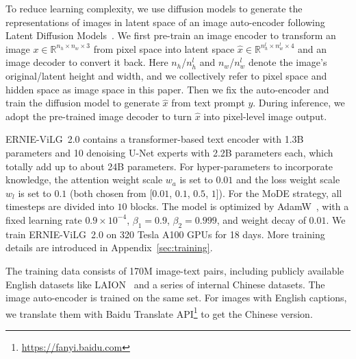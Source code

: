 \documentclass[10pt,twocolumn,letterpaper]{article}
\begin{document}
To reduce learning complexity, we use diffusion models to generate the representations of images in latent space of an image auto-encoder following Latent Diffusion Models~\cite{DBLP:journals/corr/abs-2112-10752}.
We first pre-train an image encoder to transform an image $x \in \mathbb{R}^{n_{h} \times n_{w} \times 3}$ from pixel space into latent space $ \hat{x} \in \mathbb{R}^{n_{h}^{l} \times n_{w}^{l} \times 4}$ and an image decoder to convert it back. Here $n_{h}$/$n_{h}^{l}$ and $n_{w}$/$n_{w}^{l}$ denote the image's original/latent height and width, and we collectively refer to pixel space and hidden space as image space in this paper.
Then we fix the auto-encoder and train the diffusion model to generate $\hat{x}$ from text prompt $y$.
During inference, we adopt the pre-trained image decoder to turn $\hat{x}$ into pixel-level image output.

ERNIE-ViLG~2.0 contains a transformer-based text encoder with 1.3B parameters and 10 denoising U-Net experts with 2.2B parameters each, which totally add up to about 24B parameters.
For hyper-parameters to incorporate knowledge, the attention weight scale $w_a$ is set to $0.01$ and the loss weight scale $w_l$ is set to $0.1$ (both chosen from [$0.01$, $0.1$, $0.5$, $1$]).
For the MoDE strategy, all timesteps are divided into $10$ blocks.
The model is optimized by AdamW~\cite{DBLP:conf/iclr/LoshchilovH19}, with a fixed learning rate $0.9 \times 10^{-4}$, ${\beta}_1=0.9$, ${\beta}_2=0.999$, and weight decay of $0.01$.
We train ERNIE-ViLG~2.0 on 320 Tesla A100 GPUs for 18 days.
More training details are introduced in Appendix~\ref{sec:training}.

The training data consists of 170M image-text pairs, including publicly available English datasets like LAION~\cite{DBLP:journals/corr/abs-2111-02114} and a series of internal Chinese datasets. The image auto-encoder is trained on the same set. For images with English captions, we translate them with Baidu Translate API\footnote{\url{https://fanyi.baidu.com}} to get the Chinese version.
\end{document}
